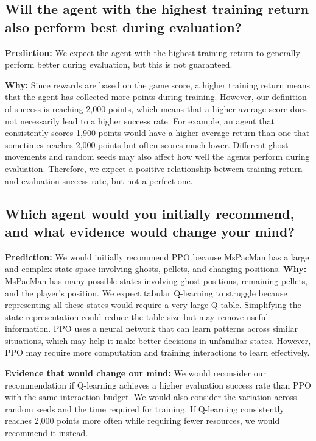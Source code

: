 \subsection{Will the agent with the highest training return also perform best during evaluation?}
\textbf{Prediction:} We expect the agent with the highest training return to generally perform better during evaluation, but this is not guaranteed.

\textbf{Why:} Since rewards are based on the game score, a higher training return means that the agent has collected more points during training. However, our definition of success is reaching 2,000 points, which means that a higher average score does not necessarily lead to a higher success rate. For example, an agent that consistently scores 1,900 points would have a higher average return than one that sometimes reaches 2,000 points but often scores much lower. Different ghost movements and random seeds may also affect how well the agents perform during evaluation. Therefore, we expect a positive relationship between training return and evaluation success rate, but not a perfect one.

\subsection{Which agent would you initially recommend, and what evidence would change your mind?}

\textbf{Prediction:} We would initially recommend PPO because MsPacMan has a large and complex state space involving ghosts, pellets, and changing positions.
\textbf{Why:} MsPacMan has many possible states involving ghost positions, remaining pellets, and the player's position. We expect tabular Q-learning to struggle because representing all these states would require a very large Q-table. Simplifying the state representation could reduce the table size but may remove useful information. PPO uses a neural network that can learn patterns across similar situations, which may help it make better decisions in unfamiliar states. However, PPO may require more computation and training interactions to learn effectively.

\textbf{Evidence that would change our mind:} We would reconsider our recommendation if Q-learning achieves a higher evaluation success rate than PPO with the same interaction budget. We would also consider the variation across random seeds and the time required for training. If Q-learning consistently reaches 2,000 points more often while requiring fewer resources, we would recommend it instead.

